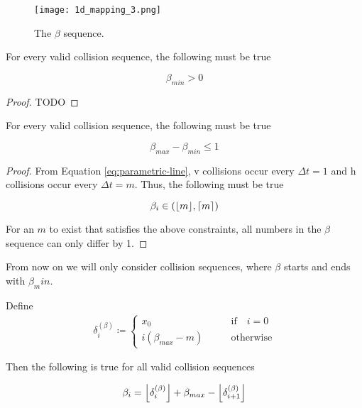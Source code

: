 \begin{figure}[H]
  \begin{center}
    \texttt{[image: 1d\_mapping\_3.png]}
  \end{center}
  \vspace{-.2in} %
  \caption{\label{fig:beta-sequence} The $\beta$ sequence.}
\end{figure}

\begin{lemma}\label{lemma:beta_pos}
	For every valid collision sequence, the following must be true

	\begin{equation}
		\beta_{min} > 0
	\end{equation}
\end{lemma}

\begin{proof}
	TODO
\end{proof}

\begin{theorem}\label{thm:beta_exremum}
	For every valid collision sequence, the following must be true
	
	\begin{equation}
		\beta_{max} - \beta_{min} \le 1
	\end{equation}
\end{theorem}

\begin{proof}

From Equation \ref{eq:parametric-line}, v collisions occur every $\Delta t = 1$ and h collisions occur every $\Delta t = m$. Thus, the following must be true

\begin{equation}
	\beta_i \in \paren{\floor{m}, \ceil{m}}
\end{equation}

For an $m$ to exist that satisfies the above constraints, all numbers in the $\beta$ sequence can only differ by 1.

\end{proof}

From now on we will only consider collision sequences, where $\beta$ starts and ends with $\beta_min$.

\begin{theorem}\label{thm:beta_i}
	Define 
	\begin{align}\label{delta_beta}
			\delta^{(\beta)}_i \coloneqq \begin{cases}
				x_0 \qquad &\text{if} \quad i = 0\\
				i (\beta_{max} - m) \qquad &\text{otherwise}
			\end{cases}
	\end{align}

	Then the following is true for all valid collision sequences

	\begin{align}\label{eq:beta_i}
		\beta_i = \floor{\delta^{(\beta)}_i} + \beta_{max} - \floor{\delta^{(\beta)}_{i+1}}
	\end{align}
\end{theorem}

